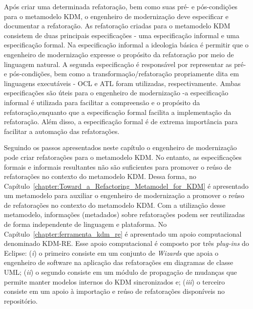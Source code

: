 Após criar uma determinada refatoração, bem como suas pré- e pós-condições para o metamodelo KDM, o engenheiro de modernização deve especificar e documentar a refatoração. As refatoração criadas para o metamodelo KDM consistem de duas principais especificações - uma especificação informal e uma especificação formal. Na especificação informal a ideologia básica é permitir que o engenheiro de modernização expresse o propósito da refatoração por meio de linguagem natural. A segunda especificação é responsável por representar as pré- e pós-condições, bem como a transformação/refatoração propriamente dita em linguagens executáveis - OCL e ATL foram utilizadas, respectivamente. Ambas especificações são úteis para o engenheiro de modernização -a especificação informal é utilizada para facilitar a compreensão e o propósito da refatoração,enquanto que a especificação formal facilita a implementação da refatoração. Além disso, a especificação formal é de extrema importância para facilitar a automação das refatorações. %

Seguindo os passos apresentados neste capítulo o engenheiro de modernização pode criar refatorações para o metamodelo KDM. No entanto, as especificações formais e informais resultantes não são suficientes para promover o reúso de refatorações no contexto do metamodelo KDM. Dessa forma, no Capítulo~\ref{chapter:Toward_a_Refactoring_Metamodel_for_KDM} é apresentado um metamodelo para auxiliar o engenheiro de modernização a promover o reúso de refatorações no contexto do metamodelo KDM. Com a utilização desse metamodelo, informações (metadados) sobre refatorações podem ser reutilizadas de forma independente de linguagem e plataforma. %
No Capítulo~\ref{chapter:ferramenta_kdm_re} é apresentado um apoio computacional denominado KDM-RE. Esse apoio computacional é composto por três \textit{plug-ins} do Eclipse: (\textit{i}) o primeiro consiste em um conjunto de \textit{Wizards} que apoia o engenheiro de software na aplicação das refatorações em diagramas de classe UML; (\textit{ii}) o segundo consiste em um módulo de propagação de mudanças que permite manter modelos internos do KDM sincronizados e; (\textit{iii}) o terceiro consiste em um apoio à importação e reúso de refatorações disponíveis no repositório.
